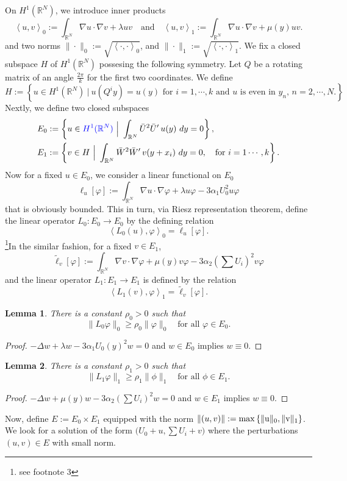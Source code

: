 \documentclass[a4paper,11pt]{article}
\def\blue{\color{blue}}
\def\blue{\color{blue}}
\newtheorem{lemma}{Lemma}[section]
\numberwithin{step}{dummy}
\begin{document}
On $H^1( \mathbb{R}^N)$, we introduce inner products
$$ \left<u,v\right>_0:= \int_{ \mathbb{R}^N} \nabla u\cdot\nabla v + \lambda uv \quad \text{and} \quad \left<u,v\right>_1:= \int_{ \mathbb{R}^N} \nabla u\cdot\nabla v + \mu(y) uv.$$ and two norms $\|\cdot\|_0:=\sqrt{\left<\cdot,\cdot\right>_0}$, and $\|\cdot\|_1:=\sqrt{\left<\cdot,\cdot\right>_1}$. We fix a closed subspace $H$ of $H^1( \mathbb{R}^N)$ possesing the following symmetry. Let $Q$ be a rotating matrix of an angle $\frac{2\pi}{k}$ for the first two coordinates. We define 
\begin{equation*}
 H:= \left\{ u \in H^1 (\mathbb{R}^N) ~\Big|~ \text{$u(Q^iy) = u(y)$ for $i=1,\cdots,k$ and $u$ is even in $y_n$, $n=2,\cdots,N$.}\right\}
\end{equation*}
Nextly, we define two closed subspaces 
\begin{equation}
 \begin{aligned}
 E_0&:= \left\{ u \in {\blue H^1( \mathbb{R}^N)} ~\Big|~ \int_{\mathbb{R}^N}   \bar{U}^2 \bar{U}^\prime \,u(y)~dy = 0 \right\}, \\
 E_1&:= \left\{ v \in H ~\Big|~ \int_{\mathbb{R}^N}   \bar{W}^2 \bar{W}^\prime \,v(y+x_i)~dy = 0, \quad \text{for $i=1\cdots,k$} \right\}.
 \end{aligned}
\end{equation}
Now for a fixed $u \in E_0$, we consider a linear functional on $E_0$
$$\ell_u[\varphi] := \int_{ \mathbb{R}^N} \nabla u\cdot\nabla\varphi + \lambda u \varphi - 3\alpha_1 U_0^2 u\varphi$$
that is obviously bounded. This in turn, via Riesz representation theorem, define the linear operator $L_0: E_0 \rightarrow E_0$ by the defining relation
$$\left<L_0(u),\varphi\right>_0 = \ell_u[\varphi].$$
\footnote{see footnote 3}In the similar fashion, for a fixed $v \in E_1$,
$$\tilde\ell_v[\varphi]:=\int_{ \mathbb{R}^N} \nabla v\cdot\nabla\varphi + \mu(y) v \varphi - 3\alpha_2 \left(\sum U_i\right)^2 v\varphi$$
and the linear operator $L_1: E_1 \rightarrow E_1$ is defined by the relation
$$\left<L_1(v),\varphi\right>_1 = \tilde\ell_v[\varphi].$$




\begin{lemma} There is a constant $\rho_0>0$ such that
$$ \|L_0 \varphi\|_0 \ge \rho_0 \|\varphi\|_0 \quad \text{for all $\varphi \in E_0$}.$$
\end{lemma}
\begin{proof}
\blue
 $-\Delta w + \lambda w - 3\alpha_1U_0(y)^2 w = 0$ and $w \in E_0$ implies $w\equiv0$. 
\end{proof}
\begin{lemma} There is a constant $\rho_1>0$ such that
$$ \|L_1 \varphi\|_1 \ge \rho_1 \|\phi\|_1 \quad \text{for all $\phi \in E_1$}.$$
\end{lemma}
\begin{proof}
\blue
 $-\Delta w + \mu(y) w - 3\alpha_2\left(\sum U_i\right)^2 w = 0$ and $w \in E_1$ implies $w\equiv0$. 
\end{proof}
Now, define $E:= E_0 \times E_1$ equipped with the norm $\|(u,v)\|:= \rm{max} \left\{ \|u\|_0, \|v\|_1\right\}$. We look for a solution of the form $\big(U_0 +u, \sum U_i + v\big)$ where the perturbations $(u,v)\in E$ with small norm. 
\end{document}
